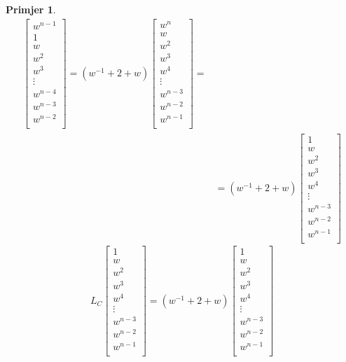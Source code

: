 \documentclass[11pt]{article}
\newtheorem{example}{Primjer}
\begin{document}
\begin{example}
\[\begin{split}
\begin{bmatrix}
		w^{n-1}  \\
		1        \\
		w        \\
		w^2      \\
		w^3      \\
		\vdots   \\
		w^{n-4}  \\
		w^{n-3}  \\
		w^{n-2}  \\
		\end{bmatrix}
		= 
		(w^{-1} + 2 + w)
		\begin{bmatrix}
		w^n      \\
		w        \\
		w^2      \\
		w^3      \\
		w^4      \\
		\vdots   \\
		w^{n-3}  \\
		w^{n-2}  \\
		w^{n-1}  \\
		\end{bmatrix} = \\
		& = 
		(w^{-1} + 2 + w)
		\begin{bmatrix}
		1      \\
		w        \\
		w^2      \\
		w^3      \\
		w^4      \\
		\vdots   \\
		w^{n-3}  \\
		w^{n-2}  \\
		w^{n-1}  \\
		\end{bmatrix}
	\end{split}
	\]
	\[
	 L_C 
	 \begin{bmatrix}
		1      \\
		w        \\
		w^2      \\
		w^3      \\
		w^4      \\
		\vdots   \\
		w^{n-3}  \\
		w^{n-2}  \\
		w^{n-1}  \\
		\end{bmatrix} 
	= 
	(w^{-1} + 2 + w)
		\begin{bmatrix}
		1      \\
		w        \\
		w^2      \\
		w^3      \\
		w^4      \\
		\vdots   \\
		w^{n-3}  \\
		w^{n-2}  \\
		w^{n-1}  \\
		\end{bmatrix}
	\]
	

\end{example}
\end{document}
